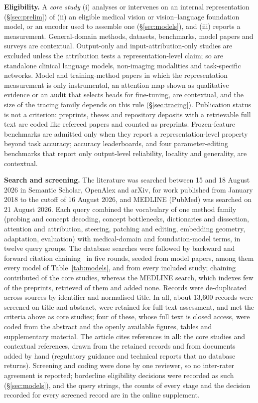 \textbf{Eligibility.} A \emph{core study} (i) analyses or intervenes on an internal representation
(\S\ref{sec:prelim}) of (ii) an eligible medical vision or vision--language foundation model, or an
encoder used to assemble one (\S\ref{sec:models}), and (iii) reports a measurement. General-domain
methods, datasets, benchmarks, model papers and surveys are contextual. Output-only and
input-attribution-only studies are excluded unless the attribution tests a representation-level claim;
so are standalone clinical language models, non-imaging modalities and task-specific networks. Model and
training-method papers in which the representation measurement is only instrumental, an attention map
shown as qualitative evidence or an audit that selects heads for fine-tuning, are contextual, and the
size of the tracing family depends on this rule (\S\ref{sec:tracing}). Publication status is not a
criterion: preprints, theses and repository deposits with a retrievable full text are coded like refereed
papers and counted as preprints. Frozen-feature benchmarks are admitted only when they report a
representation-level property beyond task accuracy; accuracy leaderboards, and four parameter-editing
benchmarks that report only output-level reliability, locality and generality, are contextual.

\textbf{Search and screening.} The literature was searched between 15 and 18 August 2026 in Semantic
Scholar, OpenAlex and arXiv, for work published from January 2018 to the cutoff of 16 August 2026, and
MEDLINE (PubMed) was searched on 21 August 2026. Each query combined the vocabulary of one method family
(probing and concept decoding, concept bottlenecks, dictionaries and dissection, attention and
attribution, steering, patching and editing, embedding geometry, adaptation, evaluation) with
medical-domain and foundation-model terms, in twelve query groups. The database searches were followed
by backward and forward citation chaining~\cite{wohlin2014guidelines} in five rounds, seeded from
\Nmodelseeds{} model papers, among them every model of Table~\ref{tab:models}, and from every included
study; chaining contributed \Nstagechain{} of the \Ncore{} core studies, whereas the MEDLINE search,
which indexes few of the preprints, retrieved \pmRecall{} of them and added none. Records were
de-duplicated across sources by identifier and normalised title. In all, about 13,600 records were
screened on title and abstract, \Nretained{} were retained for full-text assessment, and \Ncore{} met
the criteria above as core studies; four of these, whose full text is closed access, were coded from the
abstract and the openly available figures, tables and supplementary material. The article cites
\Ncited{} references in all: the core studies and \Ncontext{} contextual references, drawn from the
retained records and from \Ncitedhand{} documents added by hand (regulatory guidance and technical
reports that no database returns). Screening and coding were done by one reviewer, so no inter-rater
agreement is reported; borderline eligibility decisions were recorded as such (\S\ref{sec:models}), and
the query strings, the counts of every stage and the decision recorded for every screened record are in
the online supplement.

